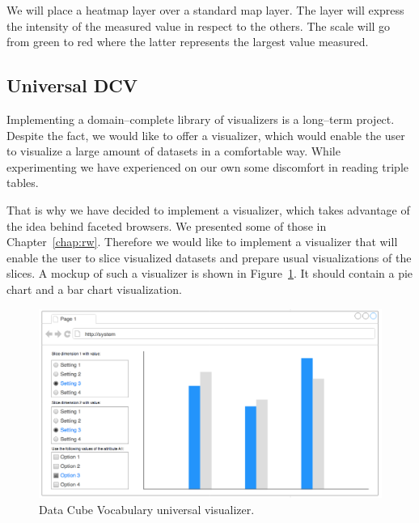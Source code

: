 We will place a heatmap layer over a standard map layer. The layer will express 
the intensity of the measured value in respect to the others. The scale will go from 
green to red where the latter represents the largest value measured.

\subsection{Universal DCV}
Implementing a domain--complete library of visualizers is a long--term project. 
Despite the fact, we would like to offer a visualizer, which would enable the 
user to visualize a large amount of datasets in a comfortable way. While
experimenting we have experienced on our own some discomfort in reading triple tables.

That is why we have decided to implement a visualizer, which takes advantage of 
the idea behind faceted browsers. We presented some of those in 
Chapter~\ref{chap:rw}. Therefore we would like to implement a visualizer that will 
enable the user to slice visualized datasets and prepare usual visualizations of 
the slices. A mockup of such a visualizer is shown in 
Figure~\ref{fig:dcv-universal}. It should contain a pie chart and a bar chart 
visualization.

\begin{figure}
	\centering
	\includegraphics[width=140mm]{img/dcv-universal.png}
	\caption{Data Cube Vocabulary universal visualizer.}
	\label{fig:dcv-universal}
\end{figure}



